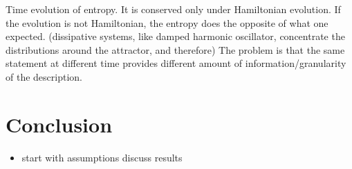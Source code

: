 \documentclass{article}
\begin{document}
Time evolution of entropy. It is conserved only under Hamiltonian evolution. If the evolution is not Hamiltonian, the entropy does the opposite of what one expected. (dissipative systems, like damped harmonic oscillator, concentrate the distributions around the attractor, and therefore) The problem is that the same statement at different time provides different amount of information/granularity of the description.
\fi

\section{Conclusion}
	
\begin{itemize}

	\item start with assumptions discuss results

\end{itemize}




\end{document}
